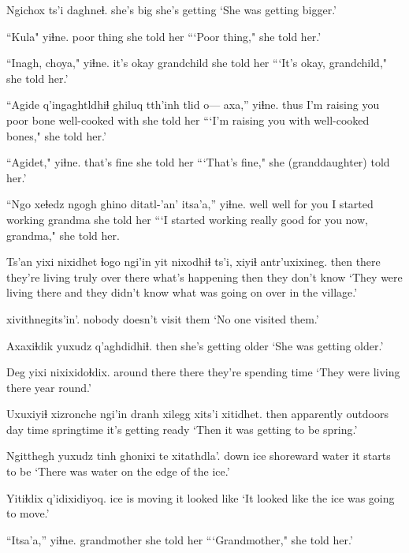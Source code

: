 \documentclass[12pt]{article}
\begin{document}
\gll Ngichox ts'i daghneɬ.
{she's big} {}  {she's getting}
\glt `She was getting bigger.'
\glend

\gll ``Kula"    yiɬne.
{poor thing} {she told her}
\glt ```Poor thing," she told her.'
\glend

\gll ``Inagh, choya,"       yiɬne.
{it's okay}     grandchild {she told her}
\glt ```It's okay, grandchild," she told her.'
\glend

\gll ``Agide q'ingaghtldhiɬ  ghiluq tth'inh tlid   o---     axa,''  yiɬne.
thus  {I'm raising you} poor   bone    well-cooked {} with {she told her}
\glt ```I'm raising you with well-cooked bones," she told her.'
\glend

\gll ``Agidet,"   yiɬne.
{that's fine} {she told her}
\glt ```That's fine," she (granddaughter) told her.'
\glend

\gll ``Ngo  xeɬedz ngogh   {ghino ditatl-'an'}  itsa'a,'' yiɬne.
well well   {for you} {I started working} grandma  {she told her}
\glt ```I started working really good for you now, grandma," she told her.
\glend

\gll Ts'an yixi nixidhet ɬogo ngi'in yit nixodhiɬ   ts'i, xiyiɬ antr'uxixineg.
then there {they're living} truly over  there  {what's happening} {}    then  {they don't know}
\glt `They were living there and they didn't know what was going on over in the village.'
\glend

 {xivithnegits'in'.}
nobody    {doesn't visit them}
\glt `No one visited them.'
\glend

\gll Axaxiɬdik yuxudz q'aghdidhiɬ.
then      {}     {she's getting older}
\glt `She was getting older.'
\glend

\gll Deg   yixi  nixixidoɬdix.
{around there}  there {they're spending time}
\glt `They were living there year round.'
\glend

\gll Uxuxiyiɬ xizronche ngi'in   dranh    xilegg {xits'i xitidhet.}
then     apparently        outdoors {day time} {springtime}        {it's getting ready}
\glt `Then it was getting to be spring.'
\glend

\gll Ngitthegh yuxudz tinh ghonixi   te    xitathdla'.      
down      {}     ice  shoreward water {it starts to be }
\glt `There was water on the edge of the ice.'
\glend

\gll Yitiɬdix     q'idixidiyoq.
{ice is moving} {it looked like}
\glt `It looked like the ice was going to move.'
\glend

\gll ``Itsa'a,'' yiɬne.
grandmother {she told her}
\glt ```Grandmother," she told her.'
\glend
\end{document}
